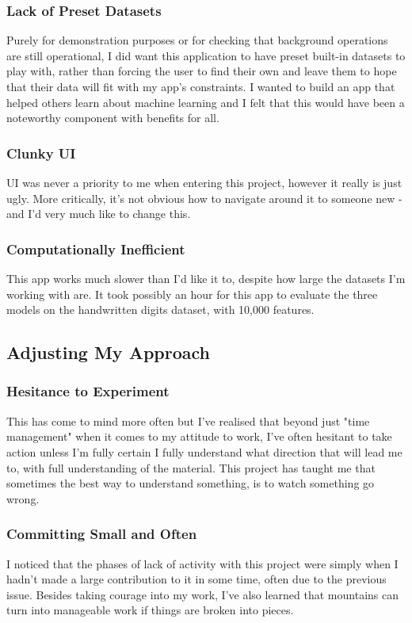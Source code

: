 \documentclass[letterpaper,10pt]{article}
\begin{document}
\subsubsection{Lack of Preset Datasets}
Purely for demonstration purposes or for checking that background operations are still operational, I did want this application to have preset built-in datasets to play with, rather than forcing the user to find their own  and leave them to hope that their data will fit with my app's constraints. I wanted to build an app that helped others learn about machine learning and I felt that this would have been a noteworthy component with benefits for all. \par

\subsubsection{Clunky UI}
UI was never a priority to me when entering this project, however it really is just ugly. More critically, it's not obvious how to navigate around it to someone new - and I'd very much like to change this. 

\subsubsection{Computationally Inefficient}
This app works much slower than I'd like it to, despite how large the datasets I'm working with are. It took possibly an hour for this app to evaluate the three models on the handwritten digits dataset, with 10,000 features.


\subsection{Adjusting My Approach}
\subsubsection{Hesitance to Experiment}
This has come to mind more often but I've realised that beyond just "time management" when it comes to my attitude to work, I've often hesitant to take action unless I'm fully certain I fully understand what direction that will lead me to, with full understanding of the material. This project has taught me that sometimes the best way to understand something, is to watch something go wrong. \par

\subsubsection{Committing Small and Often}
I noticed that the phases of lack of activity with this project were simply when I hadn't made a large contribution to it in some time, often due to the previous issue. Besides taking courage into my work, I've also learned that mountains can turn into manageable work if things are broken into pieces. \par
\end{document}
